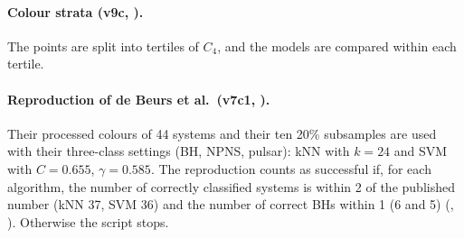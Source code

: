 \paragraph{Colour strata (v9c, ).} The points are split into tertiles of $C_4$, and the
models are compared within each tertile.

\paragraph{Reproduction of de Beurs et al.\ (v7c1, ).} Their processed colours of 44 systems and
their ten 20\% subsamples are used with their three-class settings (BH, NPNS, pulsar): kNN with $k=24$ and SVM with $C=0.655$,
$\gamma=0.585$. The reproduction counts as successful if, for each algorithm, the number of correctly classified systems
is within 2 of the published number (kNN 37, SVM 36) and the number of correct BHs within 1 (6 and 5)
(, ). Otherwise the script stops.

